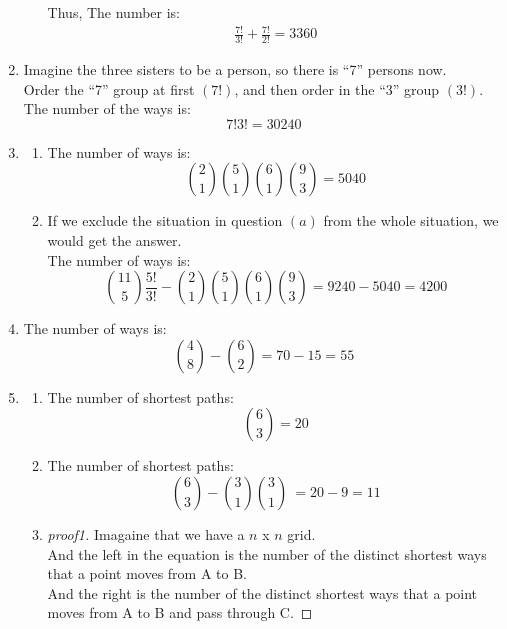\documentclass{article}
\begin{document}
\begin{enumerate}
\begin{enumerate}
            Thus, The number is:
            \begin{align*}
                \frac{7!}{3!} + \frac{7!}{2!} = 3360
            \end{align*}
        \end{enumerate}
        \item 
        Imagine the three sisters to be a person,
        so there is ``7'' persons now.\\
        Order the ``7'' group at first \((7!)\),
        and then order in the ``3'' group \((3!)\).\\
        The number of the ways is:
        \[7!3! = 30240\]
        \item 
        \begin{enumerate}
            \item The number of ways is:
            \[\binom{2}{1} \binom{5}{1} \binom{6}{1} \binom{9}{3} = 5040\]
            \item If we exclude the situation in question \((a)\) from the whole situation,
            we would get the answer.\\
            The number of ways is:
            \[\binom{11}{5} \frac{5!}{3!} - 
            \binom{2}{1} \binom{5}{1} \binom{6}{1} \binom{9}{3} = 9240 - 5040 = 4200\]
        \end{enumerate}
        \item The number of ways is: 
            \[\binom{4}{8} - \binom{6}{2} = 70 - 15 = 55\]
        \item 
        \begin{enumerate}
            \item The number of shortest paths:
            \[\binom{6}{3} = 20\]
            \item The number of shortest paths:
            \[\binom{6}{3} - \binom{3}{1} \binom{3}{1}\ = 20 - 9 = 11\]
            \item 
            \begin{proof}[proof1]
                Imagaine that we have a $n$ x $n$ grid.\\
                And the left in the equation is the number of the distinct shortest ways that a point moves from A to B.\\
                And the right is the number of the distinct shortest ways that a point moves from A to B and pass through C.

\end{proof}
\end{enumerate}
\end{enumerate}
\end{document}
